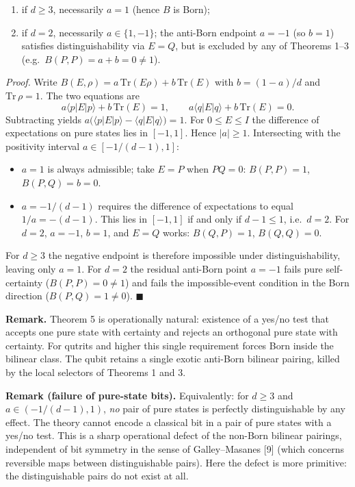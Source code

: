 \documentclass[
]{article}
\providecommand{\tightlist}{%
  \setlength{\itemsep}{0pt}\setlength{\parskip}{0pt}}
\begin{document}
\begin{enumerate}
\def\labelenumi{\arabic{enumi}.}
\tightlist
\item
  if \(d\geq 3\), necessarily \(a=1\) (hence \(B\) is Born);
\item
  if \(d=2\), necessarily \(a\in\{1,-1\}\); the anti-Born endpoint
  \(a=-1\) (so \(b=1\)) satisfies distinguishability via \(E=Q\), but is
  excluded by any of Theorems 1--3 (e.g.~\(B(P,P)=a+b=0\neq 1\)).
\end{enumerate}

\emph{Proof.} Write
\(B(E,\rho)=a\,\mathrm{Tr}(E\rho)+b\,\mathrm{Tr}(E)\) with \(b=(1-a)/d\)
and \(\mathrm{Tr}\,\rho=1\). The two equations are
\[a\langle p|E|p\rangle+b\,\mathrm{Tr}(E)=1,\qquad a\langle q|E|q\rangle+b\,\mathrm{Tr}(E)=0.\]
Subtracting yields
\(a\bigl(\langle p|E|p\rangle-\langle q|E|q\rangle\bigr)=1\). For
\(0\leq E\leq I\) the difference of expectations on pure states lies in
\([-1,1]\). Hence \(|a|\geq 1\). Intersecting with the positivity
interval \(a\in[-1/(d-1),1]\):

\begin{itemize}
\tightlist
\item
  \(a=1\) is always admissible; take \(E=P\) when \(PQ=0\):
  \(B(P,P)=1\), \(B(P,Q)=b=0\).
\item
  \(a=-1/(d-1)\) requires the difference of expectations to equal
  \(1/a=-(d-1)\). This lies in \([-1,1]\) if and only if \(d-1\leq 1\),
  i.e.~\(d=2\). For \(d=2\), \(a=-1\), \(b=1\), and \(E=Q\) works:
  \(B(Q,P)=1\), \(B(Q,Q)=0\).
\end{itemize}

For \(d\geq 3\) the negative endpoint is therefore impossible under
distinguishability, leaving only \(a=1\). For \(d=2\) the residual
anti-Born point \(a=-1\) fails pure self-certainty (\(B(P,P)=0\neq 1\))
and fails the impossible-event condition in the Born direction
(\(B(P,Q)=1\neq 0\)). \(\blacksquare\)

\textbf{Remark.} Theorem 5 is operationally natural: existence of a
yes/no test that accepts one pure state with certainty and rejects an
orthogonal pure state with certainty. For qutrits and higher this single
requirement forces Born inside the bilinear class. The qubit retains a
single exotic anti-Born bilinear pairing, killed by the local selectors
of Theorems 1 and 3.

\textbf{Remark (failure of pure-state bits).} Equivalently: for
\(d\geq 3\) and \(a\in(-1/(d-1),1)\), \emph{no} pair of pure states is
perfectly distinguishable by any effect. The theory cannot encode a
classical bit in a pair of pure states with a yes/no test. This is a
sharp operational defect of the non-Born bilinear pairings, independent
of bit symmetry in the sense of Galley--Masanes {[}9{]} (which concerns
reversible maps between distinguishable pairs). Here the defect is more
primitive: the distinguishable pairs do not exist at all.
\end{document}
